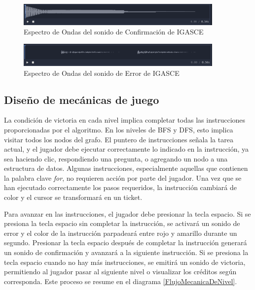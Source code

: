 \begin{figure}[h]
	\centering
	\includegraphics[width=0.9\textwidth]{imagenes/EspectroOndasConfirmacion.png}
	\caption{Espectro de Ondas del sonido de Confirmación de IGASCE}
	\label{EspectroOndasSonidoConfirmacion}
\end{figure}


\begin{figure}[h]
	\centering
	\includegraphics[width=0.9\textwidth]{imagenes/EspectroOndasError.png}
	\caption{Espectro de Ondas del sonido de Error de IGASCE}
	\label{EspectroOndasSonidoError}
\end{figure}


\subsection{Diseño de mecánicas de juego}

La condición de victoria en cada nivel implica completar todas las instrucciones proporcionadas por el algoritmo. En los niveles de BFS y DFS, esto implica visitar todos los nodos del grafo. El puntero de instrucciones señala la tarea actual, y el jugador debe ejecutar correctamente lo indicado en la instrucción, ya sea haciendo clic, respondiendo una pregunta, o agregando un nodo a una estructura de datos. Algunas instrucciones, especialmente aquellas que contienen la palabra clave \textit{for}, no requieren acción por parte del jugador. Una vez que se han ejecutado correctamente los pasos requeridos, la instrucción cambiará de color y el cursor se transformará en un ticket.

Para avanzar en las instrucciones, el jugador debe presionar la tecla espacio. Si se presiona la tecla espacio sin completar la instrucción, se activará un sonido de error y el color de la instrucción parpadeará entre rojo y amarillo durante un segundo. Presionar la tecla espacio después de completar la instrucción generará un sonido de confirmación y avanzará a la siguiente instrucción. Si se presiona la tecla espacio cuando no hay más instrucciones, se emitirá un sonido de victoria, permitiendo al jugador pasar al siguiente nivel o visualizar los créditos según corresponda. Este proceso se resume en el diagrama \ref{FlujoMecanicaDeNivel}.


